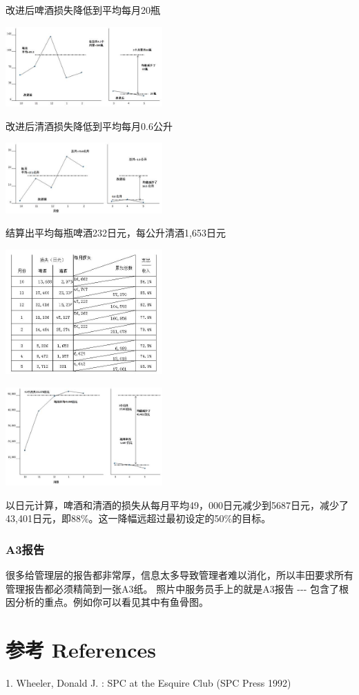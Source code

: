 改进后啤酒损失降低到平均每月20瓶


\includegraphics[width=6cm]{club201.jpg}

改进后清酒损失降低到平均每月0.6公升


\includegraphics[width=6cm]{club202.jpg}

结算出平均每瓶啤酒232日元，每公升清酒1,653日元


\includegraphics[width=6cm]{club211.jpg}


\includegraphics[width=6cm]{club221.jpg}

以日元计算，啤酒和清酒的损失从每月平均49，000日元减少到5687日元，减少了43,401日元，即88\%。这一降幅远超过最初设定的50\%的目标。

\hypertarget{a3ux62a5ux544a}{%
\subsubsection{A3报告}\label{a3ux62a5ux544a}}

很多给管理层的报告都非常厚，信息太多导致管理者难以消化，所以丰田要求所有管理报告都必须精简到一张A3纸。
照片中服务员手上的就是A3报告 -\/-\/-
包含了根因分析的重点。例如你可以看见其中有鱼骨图。

\hypertarget{ux9644ux4ef6}{%
\section{参考 References}\label{ux9644ux4ef6}}

1. Wheeler, Donald J. : SPC at the Esquire Club (SPC Press 1992)

